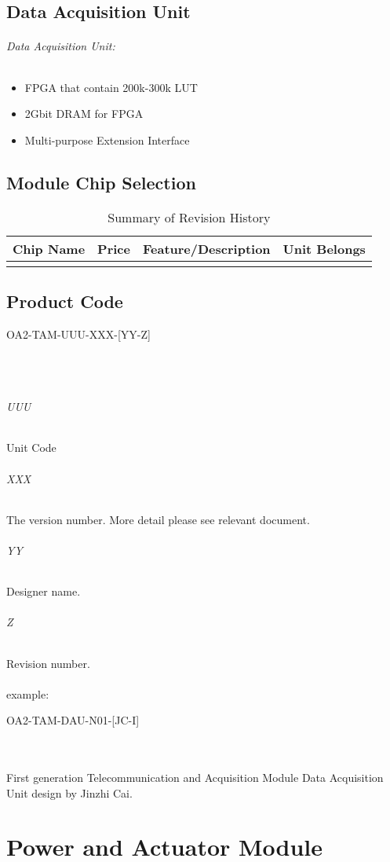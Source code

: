 \documentclass[12pt,article]{memoir}
\begin{document}
\section{Data Acquisition Unit}
\subparagraph{Data Acquisition Unit:}
\begin{itemize}
	\item FPGA that contain 200k-300k LUT
	\item 2Gbit DRAM for FPGA
	\item Multi-purpose Extension Interface
\end{itemize}
\section{Module Chip Selection}
\begin{table}[H]
	\centering
	\begin{tabu}{ c | c | c | c }
		Chip Name & Price & Feature/Description & Unit Belongs\\ \hline
		 & & & \\
	\end{tabu}
	\caption{Summary of Revision History}
	\label{tab:slc}
\end{table}
\section{Product Code}
\begin{LARGE}
OA2-TAM-UUU-XXX-[YY-Z]
\end{LARGE}\\\\
\subparagraph{UUU}
Unit Code
\subparagraph{XXX}
The version number. More detail please see relevant document.
\subparagraph{YY}
Designer name.
\subparagraph{Z}
Revision number.\\\\
example: 
\begin{large}
OA2-TAM-DAU-N01-[JC-I]
\end{large}\\\\
First generation Telecommunication and Acquisition Module Data Acquisition Unit design by Jinzhi Cai.
\newpage
\chapter{Power and Actuator Module}
\end{document}
